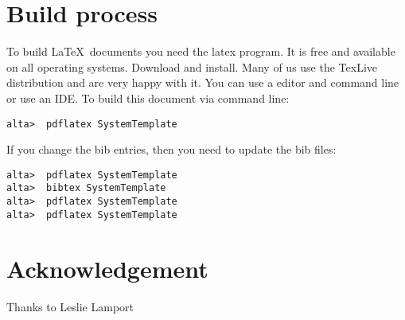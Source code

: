 \section{Build process}

To build \LaTeX\ documents you need the latex program.  It is free and available on all operating systems.   Download and install.  Many of us use the TexLive distribution and are very happy with it.    You can use a editor and command line or use an IDE.  To build this document via command line:

\begin{verbatim}
alta>  pdflatex SystemTemplate
\end{verbatim}
If you change the bib entries, then you need to update the bib files:
\begin{verbatim}
alta>  pdflatex SystemTemplate
alta>  bibtex SystemTemplate
alta>  pdflatex SystemTemplate
alta>  pdflatex SystemTemplate
\end{verbatim}


\section*{Acknowledgement}
Thanks to Leslie Lamport


